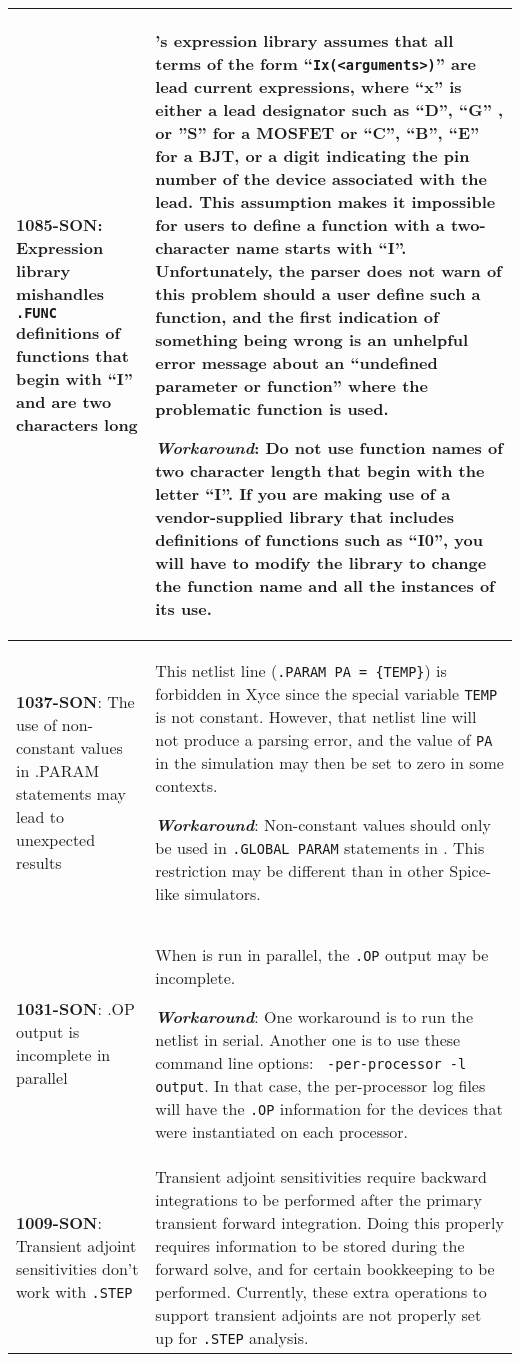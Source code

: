 {\begin{longtable}[h] {>{\raggedright\small}m{2in}|>{\raggedright\let\\\tabularnewline\small}m{3.5in}}
\textbf{1085-SON}: Expression library mishandles \texttt{.FUNC} definitions of functions that begin with ``I'' and are two characters long &
\Xyce{}'s expression library assumes that all terms of the form
``\texttt{Ix(<arguments>)}'' are lead current expressions, where ``x'' is
either a lead designator such as ``D'', ``G'' , or ''S'' for a MOSFET
or ``C'', ``B'', ``E'' for a BJT, or a digit indicating the pin number
of the device associated with the lead.  This assumption makes it
impossible for users to define a function with a two-character name
starts with ``I''.  Unfortunately, the parser does not warn of this
problem should a user define such a function, and the first indication
of something being wrong is an unhelpful error message about an
``undefined parameter or function'' where the problematic function is
used.

\textbf{\textit{Workaround}}: Do not use function names of two character
length that begin with the letter ``I''.  If you are making use of a
vendor-supplied library that includes definitions of functions such as
``I0'', you will have to modify the library to change the function
name and all the instances of its use.
\\ \hline

\textbf{1037-SON}: The use of non-constant values in .PARAM
statements may lead to unexpected results &  This netlist line
(\texttt{.PARAM PA = \{TEMP\}}) is forbidden in Xyce since
the special variable \texttt{TEMP} is not constant.  However,
that netlist line will not produce a \Xyce{} parsing error, and
the value of \texttt{PA} in the simulation may then be set to 
zero in some contexts.

\textbf{\textit{Workaround}}: Non-constant values should only
be used in \texttt{.GLOBAL PARAM} statements in \Xyce{}. This
restriction may be different than in other Spice-like 
simulators.
\\ \hline

\textbf{1031-SON}: .OP output is incomplete in parallel & When \Xyce{}
is run in parallel, the \texttt{.OP} output may be incomplete. 

\textbf{\textit{Workaround}}: One workaround is to run the netlist in 
serial.  Another one is to use these command line options: \texttt{
-per-processor -l output}.  In that case, the per-processor log files 
will have the \texttt{.OP} information for the devices that were 
instantiated on each processor.
\\ \hline 

  \textbf{1009-SON}:  Transient adjoint sensitivities don't work with \texttt{.STEP}
  & Transient adjoint sensitivities require backward integrations to be performed after the primary transient forward integration.  Doing this properly requires information to be stored during the forward solve, and for certain bookkeeping to be performed.  Currently, these extra operations to support transient adjoints are not properly set up for \texttt{.STEP} analysis.


\end{longtable}}
